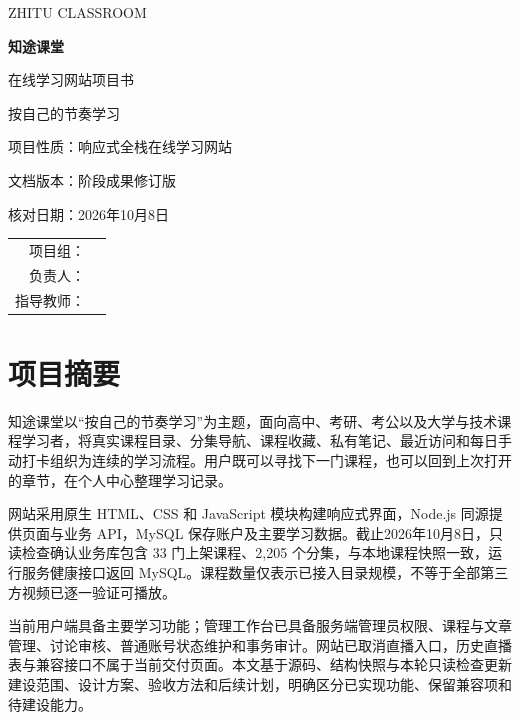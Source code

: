 \documentclass[UTF8,12pt,a4paper,openany,oneside]{ctexbook}
\newcommand{\project}{知途课堂}
\newcommand{\revisiondate}{2026年10月8日}
\begin{document}
\begin{titlepage}
\centering
\vspace*{2.2cm}
{\color{Brand}\large ZHITU CLASSROOM\par}
\vspace{0.8cm}
{\Huge\bfseries 知途课堂\par}
\vspace{0.6cm}
{\LARGE 在线学习网站项目书\par}
\vspace{0.8cm}
{\Large 按自己的节奏学习\par}
\vspace{1.3cm}
{\large 项目性质：响应式全栈在线学习网站\par}
\vspace{0.3cm}
{\large 文档版本：阶段成果修订版\par}
\vspace{0.3cm}
{\large 核对日期：\revisiondate\par}
\vfill
\begin{tabular}{rl}
项目组：&\underline{\hspace{8cm}}\\[0.7cm]
负责人：&\underline{\hspace{8cm}}\\[0.7cm]
指导教师：&\underline{\hspace{8cm}}
\end{tabular}
\vspace{1.5cm}
\end{titlepage}
\frontmatter
\chapter*{项目摘要}
\project 以“按自己的节奏学习”为主题，面向高中、考研、考公以及大学与技术课程学习者，将真实课程目录、分集导航、课程收藏、私有笔记、最近访问和每日手动打卡组织为连续的学习流程。用户既可以寻找下一门课程，也可以回到上次打开的章节，在个人中心整理学习记录。

网站采用原生 HTML、CSS 和 JavaScript 模块构建响应式界面，Node.js 同源提供页面与业务 API，MySQL 保存账户及主要学习数据。截止\revisiondate，只读检查确认业务库包含 33 门上架课程、2,205 个分集，与本地课程快照一致，运行服务健康接口返回 MySQL。课程数量仅表示已接入目录规模，不等于全部第三方视频已逐一验证可播放。

当前用户端具备主要学习功能；管理工作台已具备服务端管理员权限、课程与文章管理、讨论审核、普通账号状态维护和事务审计。网站已取消直播入口，历史直播表与兼容接口不属于当前交付页面。本文基于源码、结构快照与本轮只读检查更新建设范围、设计方案、验收方法和后续计划，明确区分已实现功能、保留兼容项和待建设能力。
\end{document}
